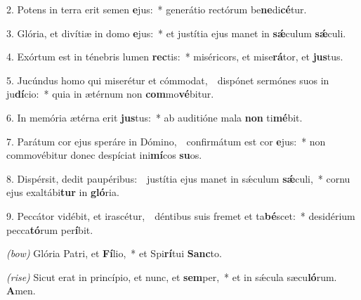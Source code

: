 2. Potens in terra erit semen \textbf{e}jus:~*
	generátio rectórum be\textbf{ne}di\textbf{cé}tur.

3. Glória, et divítiæ in domo \textbf{e}jus:~*
	et justítia ejus manet in \textbf{s\'{\ae}}culum \textbf{s\'{\ae}}culi.

4. Exórtum est in ténebris lumen \textbf{rec}tis:~*
	miséricors, et mise\textbf{rá}tor, et \textbf{jus}tus.

5. Jucúndus homo qui miserétur et cómmodat,~\GreDagger\
	dispónet sermónes suos in ju\textbf{dí}cio:~*
	quia in ætérnum non \textbf{com}mo\textbf{vé}bitur.

6. In memória ætérna erit \textbf{jus}tus:~*
	ab auditióne mala \textbf{non} ti\textbf{mé}bit.

7. Parátum cor ejus speráre in Dómino,~\GreDagger\
	confirmátum est cor \textbf{e}jus:~*
	non commovébitur donec despíciat ini\textbf{mí}cos \textbf{su}os.

8. Dispérsit, dedit paupéribus:~\GreDagger\
	justítia ejus manet in s\'{\ae}culum \textbf{s\'{\ae}}\-culi,~*
	cornu ejus exaltábi\textbf{tur} in \textbf{gló}ria.

9. Peccátor vidébit, et irascétur,~\GreDagger\
	déntibus suis fremet et ta\textbf{bé}scet:~*
	desidérium pecca\textbf{tó}rum per\textbf{í}bit.
	
\textit{(bow)} Glória Patri, et \textbf{Fí}lio,~*
	et Spi\textbf{rí}tui \textbf{Sanc}to.

\textit{(rise)} Sicut erat in princípio, et nunc, et \textbf{sem}per,~*
	et in s\'{\ae}cula sæcu\textbf{ló}rum. \textbf{A}men.